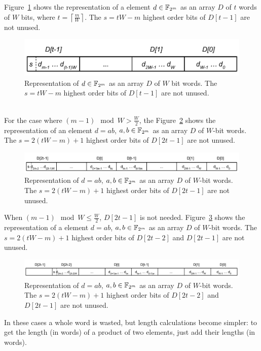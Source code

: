 Figure~\ref{fig:elemento:field} shows the representation of a element $d \in {\mathbb F}_{2^m}$ as an array $D$ of $t$ words of $W$ bits, where $t = \left \lceil \frac{m}{W} \right \rceil$. The $s = tW-m$ highest order bits of $D[t-1]$ are not unused.
\begin{figure}[htb]
  \centering
  \includegraphics[width = .55\columnwidth]{figures/element-word.pdf}
\caption{Representation of $d \in {\mathbb F}_{2^m}$ as an array $D$ of $W$ bit words. The $s = tW-m$ highest order bits of $D[t-1]$ are not unused.}
\label{fig:elemento:field}
\end{figure}
\\

For the case where $(m-1) \mod{W} > \frac{W}{2}$, the Figure~\ref{fig:elemento:field:mult} shows the representation of an element $d = ab$, $a,b \in {\mathbb F}_{2^m}$ as an array $D$ of $W$-bit words. The $s = 2(tW-m)+1$ highest order bits of $D[2t-1]$ are not unused.

\begin{figure}
  \centering
  \includegraphics[width = .9\columnwidth]{figures/two-word-element-1.pdf}
\caption{Representation of $d = ab$, $a,b \in {\mathbb F}_{2^m}$ as an array $D$ of $W$-bit words. The $s = 2(tW-m)+1$ highest order bits of $D[2t-1]$ are not unused.}
\label{fig:elemento:field:mult}
\end{figure}


When $(m-1) \mod{W} \leq \frac{W}{2}$, $D[2t-1]$ is not needed.  Figure~\ref{fig:elemento:field:mult2} shows the representation of a element $d = ab$, $a,b \in {\mathbb F}_{2^m}$ as an array $D$ of $W$-bit words. The $s = 2(tW-m)+1$ highest order bits of $D[2t-2]$ and $D[2t-1]$ are not unused.
\begin{figure}
  \centering
  \includegraphics[width = \columnwidth]{figures/two-word-element-2.pdf}
\caption{Representation of $d = ab$, $a,b \in {\mathbb F}_{2^m}$ as an array $D$ of $W$-bit words. The $s = 2(tW-m)+1$ highest order bits of $D[2t-2]$ and $D[2t-1]$ are not unused.}
\label{fig:elemento:field:mult2}
\end{figure}

In these cases a whole word is wasted, but length calculations become simpler: to get the length (in words) of a product of two elements, just add their lengths (in words).